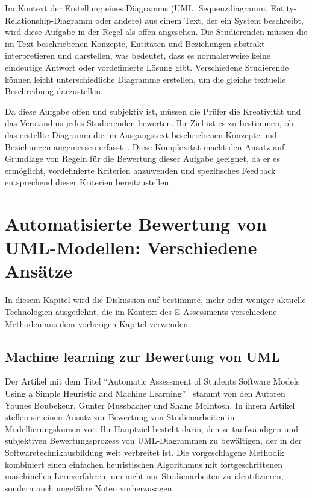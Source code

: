 Im Kontext der Erstellung eines Diagramms (UML, Sequenzdiagramm, Entity-Relationship-Diagramm oder andere) aus einem Text, der ein System beschreibt, wird diese Aufgabe in der Regel als offen angesehen. Die Studierenden müssen die im Text beschriebenen Konzepte, Entitäten und Beziehungen abstrakt interpretieren und darstellen, was bedeutet, dass es normalerweise keine eindeutige Antwort oder vordefinierte Lösung gibt. Verschiedene Studierende können leicht unterschiedliche Diagramme erstellen, um die gleiche textuelle Beschreibung darzustellen.

Da diese Aufgabe offen und subjektiv ist, müssen die Prüfer die Kreativität und das Verständnis jedes Studierenden bewerten. Ihr Ziel ist es zu bestimmen, ob das erstellte Diagramm die im Ausgangstext beschriebenen Konzepte und Beziehungen angemessen erfasst~\cite{fellmann2016evaluation}. Diese Komplexität macht den Ansatz auf Grundlage von Regeln für die Bewertung dieser Aufgabe geeignet, da er es ermöglicht, vordefinierte Kriterien anzuwenden und spezifisches Feedback entsprechend dieser Kriterien bereitzustellen.


\section{Automatisierte Bewertung von UML-Modellen: Verschiedene Ansätze}\label{sec:automatisierte-bewertung-von-uml-modellen:-verschiedene-ansatze}

In diesem Kapitel wird die Diskussion auf bestimmte, mehr oder weniger aktuelle Technologien ausgedehnt, die im Kontext des E-Assessments verschiedene Methoden aus dem vorherigen Kapitel verwenden.

\subsection{Machine learning zur Bewertung von UML}

Der Artikel mit dem Titel ``Automatic Assessment of Students Software Models Using a Simple Heuristic and Machine
Learning''~\cite{boubekeur2020automatic} stammt von den Autoren Younes Boubekeur, Gunter Mussbacher und Shane McIntosh.
In ihrem Artikel stellen sie einen Ansatz zur Bewertung von Studienarbeiten in Modellierungskursen vor. Ihr
Hauptziel besteht darin, den zeitaufwändigen und subjektiven Bewertungsprozess von UML-Diagrammen zu bewältigen, der in
der Softwaretechnikausbildung weit verbreitet ist. Die vorgeschlagene Methodik kombiniert einen einfachen heuristischen
Algorithmus mit fortgeschrittenen maschinellen Lernverfahren, um nicht nur Studienarbeiten zu
identifizieren, sondern auch ungefähre Noten vorherzusagen.

